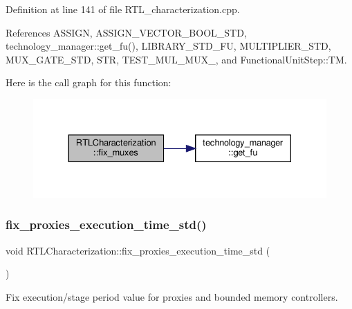 Definition at line 141 of file R\+T\+L\+\_\+characterization.\+cpp.



References A\+S\+S\+I\+GN, A\+S\+S\+I\+G\+N\+\_\+\+V\+E\+C\+T\+O\+R\+\_\+\+B\+O\+O\+L\+\_\+\+S\+TD, technology\+\_\+manager\+::get\+\_\+fu(), L\+I\+B\+R\+A\+R\+Y\+\_\+\+S\+T\+D\+\_\+\+FU, M\+U\+L\+T\+I\+P\+L\+I\+E\+R\+\_\+\+S\+TD, M\+U\+X\+\_\+\+G\+A\+T\+E\+\_\+\+S\+TD, S\+TR, T\+E\+S\+T\+\_\+\+M\+U\+L\+\_\+\+M\+U\+X\+\_, and Functional\+Unit\+Step\+::\+TM.

Here is the call graph for this function\+:
\nopagebreak
\begin{figure}[H]
\begin{center}
\leavevmode
\includegraphics[width=330pt]{d9/d84/classRTLCharacterization_a5f3dcbe12f62ab3c698e9802d9caf145_cgraph}
\end{center}
\end{figure}
\mbox{\label{classRTLCharacterization_a92793e13528e187fc9c662ebc5ef7abe}} 
\subsubsection{\texorpdfstring{fix\+\_\+proxies\+\_\+execution\+\_\+time\+\_\+std()}{fix\_proxies\_execution\_time\_std()}}
{\footnotesize\ttfamily void R\+T\+L\+Characterization\+::fix\+\_\+proxies\+\_\+execution\+\_\+time\+\_\+std (\begin{DoxyParamCaption}{ }\end{DoxyParamCaption})\hspace{0.3cm}{\ttfamily [private]}}



Fix execution/stage period value for proxies and bounded memory controllers. 



